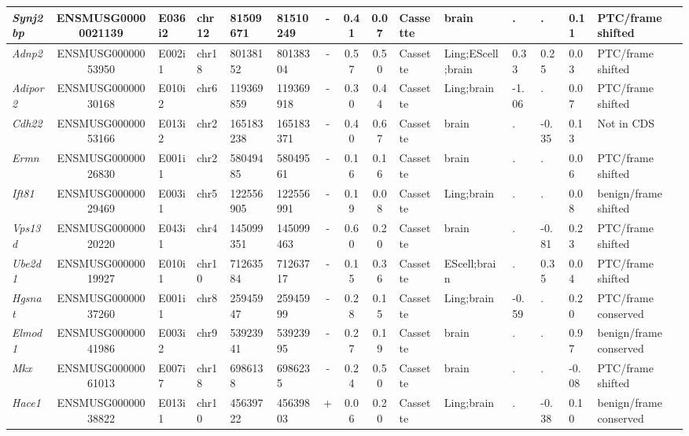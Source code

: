 \begin{landscape}
\begin{table}[htbp]
{\begin{tabular}{|l|c|l|l|l|l|c|c|c|l|l|l|l|l|l|}
		\textit{Synj2bp} & ENSMUSG00000021139 & E036i2 & chr12 & 81509671 & 81510249 & -     & 0.41  & 0.07  & Cassette & brain & .     & .     & 0.11  & PTC/frame shifted \\ \hline
		\textit{Adnp2} & ENSMUSG00000053950 & E002i1 & chr18 & 80138152 & 80138304 & -     & 0.57  & 0.50  & Cassette & Ling;EScell;brain & 0.33  & 0.25  & 0.03  & PTC/frame shifted \\ \hline
		\textit{Adipor2} & ENSMUSG00000030168 & E010i2 & chr6  & 119369859 & 119369918 & -     & 0.30  & 0.44  & Cassette & Ling;brain & -1.06 & .     & 0.07  & PTC/frame shifted \\ \hline
		\textit{Cdh22} & ENSMUSG00000053166 & E013i2 & chr2  & 165183238 & 165183371 & -     & 0.40  & 0.67  & Cassette & brain & .     & -0.35 & 0.13  & Not in CDS \\ \hline
		\textit{Ermn} & ENSMUSG00000026830 & E001i1 & chr2  & 58049485 & 58049561 & -     & 0.16  & 0.16  & Cassette & brain & .     & .     & 0.06  & PTC/frame shifted \\ \hline
		\textit{Ift81} & ENSMUSG00000029469 & E003i1 & chr5  & 122556905 & 122556991 & -     & 0.19  & 0.08  & Cassette & Ling;brain & .     & .     & 0.08  & benign/frame shifted \\ \hline
		\textit{Vps13d} & ENSMUSG00000020220 & E043i1 & chr4  & 145099351 & 145099463 & -     & 0.60  & 0.20  & Cassette & brain & .     & -0.81 & 0.23  & PTC/frame shifted \\ \hline
		\textit{Ube2d1} & ENSMUSG00000019927 & E010i1 & chr10 & 71263584 & 71263717 & -     & 0.15  & 0.36  & Cassette & EScell;brain & .     & 0.35  & 0.04  & PTC/frame shifted \\ \hline
		\textit{Hgsnat} & ENSMUSG00000037260 & E001i1 & chr8  & 25945947 & 25945999 & -     & 0.28  & 0.15  & Cassette & Ling;brain & -0.59 & .     & 0.20  & PTC/frame conserved \\ \hline
		\textit{Elmod1} & ENSMUSG00000041986 & E003i2 & chr9  & 53923941 & 53923995 & -     & 0.27  & 0.19  & Cassette & brain & .     & .     & 0.97  & benign/frame conserved \\ \hline
		\textit{Mkx} & ENSMUSG00000061013 & E007i7 & chr18 & 6986138 & 6986235 & -     & 0.24  & 0.50  & Cassette & brain & .     & .     & -0.08 & PTC/frame shifted \\ \hline
		\textit{Hace1} & ENSMUSG00000038822 & E013i1 & chr10 & 45639722 & 45639803 & +     & 0.06  & 0.20  & Cassette & Ling;brain & .     & -0.38 & 0.10  & benign/frame conserved \\ \hline

\end{tabular}}
\end{table}
\end{landscape}
